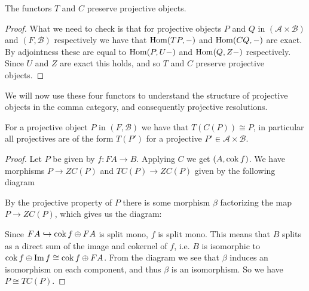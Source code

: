 \begin{cor}
	The functors $T$ and $C$ preserve projective objects.
	\begin{proof}
		What we need to check is that for projective objects $P$ and $Q$ in $(\mathcal A \times \mathcal B)$ and $(F, \mathcal B)$ respectively we have that $\operatorname{Hom}(TP, -)$ and $\operatorname{Hom}(CQ, -)$ are exact. By adjointness these are equal to $\operatorname{Hom}(P, U-)$ and $\operatorname{Hom}(Q, Z-)$ respectively. Since $U$ and $Z$ are exact this holds, and so $T$ and $C$ preserve projective objects.
	\end{proof}
\end{cor}

We will now use these four functors to understand the structure of projective objects in the comma category, and consequently projective resolutions.

\begin{prop}\cite[Corollary~1.6c]{FGR75}
	For a projective object $P$ in $(F, \mathcal B)$ we have that $T(C(P)) \cong P$, in particular all projectives are of the form $T(P')$ for a projective $P' \in \mathcal A \times \mathcal B$.
	\begin{proof}
		Let $P$ be given by $f\colon FA \to B$. Applying $C$ we get $(A, \operatorname{cok} f)$. We have morphisms $P \to ZC(P)$ and $TC(P) \to ZC(P)$ given by the following diagram
		\begin{center}
		\end{center}
		By the projective property of $P$ there is some morphism $\beta$ factorizing the map $P \to ZC(P)$, which gives us the diagram:
		\begin{center}
		\end{center}
		Since $FA \hookrightarrow \operatorname{cok} f \oplus FA$ is split mono, $f$ is split mono. This means that $B$ splits as a direct sum of the image and cokernel of $f$, i.e. $B$ is isomorphic to $\operatorname{cok} f \oplus \operatorname{Im} f \cong \operatorname{cok} f \oplus FA$. From the diagram we see that $\beta$ induces an isomorphism on each component, and thus $\beta$ is an isomorphism. So we have $P \cong TC(P)$.
	\end{proof}
\end{prop}

